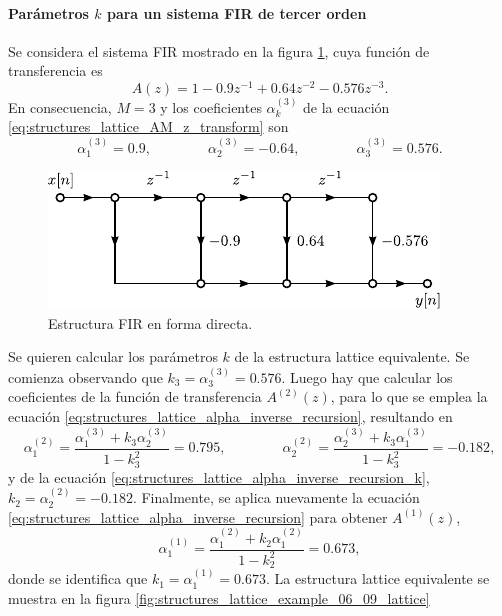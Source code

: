 \documentclass[a4paper]{report}
\begin{document}
\paragraph{Parámetros \(k\) para un sistema FIR de tercer orden} Se considera el sistema FIR mostrado en la figura \ref{fig:structures_lattice_example_06_09_FIR_direct}, cuya función de transferencia es
\[
 A(z)=1-0.9z^{-1}+0.64z^{-2}-0.576z^{-3}.
\]
En consecuencia, \(M=3\) y los coeficientes \(\alpha^{(3)}_k\) de la ecuación \ref{eq:structures_lattice_AM_z_transform} son
\[
 \alpha^{(3)}_1=0.9,
 \qquad\qquad 
 \alpha^{(3)}_2=-0.64,
 \qquad\qquad
 \alpha^{(3)}_3=0.576.
\]
 \begin{figure}[!htb]
  \begin{minipage}[c]{0.55\textwidth}
    \includegraphics[width=\textwidth]{figuras/structures_lattice_example_06_09_FIR_direct.pdf}
  \end{minipage}\hfill
  \begin{minipage}[c]{0.35\textwidth}
    \caption{
     Estructura FIR en forma directa.
    }\label{fig:structures_lattice_example_06_09_FIR_direct}
  \end{minipage}
\end{figure}
Se quieren calcular los parámetros \(k\) de la estructura lattice equivalente. Se comienza observando que \(k_3=\alpha^{(3)}_3=0.576\). Luego hay que calcular los coeficientes de la función de transferencia \(A^{(2)}(z)\), para lo que se emplea la ecuación \ref{eq:structures_lattice_alpha_inverse_recursion}, resultando en
\[
 \alpha^{(2)}_1=\frac{\alpha^{(3)}_1+k_3\alpha^{(3)}_2}{1-k_3^2}=0.795,
 \qquad\qquad
 \alpha^{(2)}_2=\frac{\alpha^{(3)}_2+k_3\alpha^{(3)}_1}{1-k_3^2}=-0.182,
\]
y de la ecuación \ref{eq:structures_lattice_alpha_inverse_recursion_k}, \(k_2=\alpha^{(2)}_2=-0.182\). Finalmente, se aplica nuevamente la ecuación \ref{eq:structures_lattice_alpha_inverse_recursion} para obtener \(A^{(1)}(z)\),
\[
 \alpha^{(1)}_1=\frac{\alpha^{(2)}_1+k_2\alpha^{(2)}_1}{1-k_2^2}=0.673,
\]
donde se identifica que \(k_1=\alpha^{(1)}_1=0.673\). La estructura lattice equivalente se muestra en la figura \ref{fig:structures_lattice_example_06_09_lattice}
\end{document}
